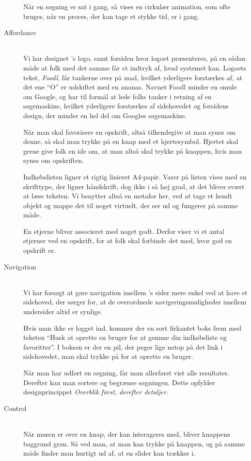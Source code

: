\begin{description}
Når en søgning er sat i gang, så vises en cirkulær animation, som ofte bruges, når en proces, der kan tage et stykke tid, er i gang.   

\item[Affordance] \hfill \\
Vi har designet \Foodl{}'s logo, samt forsiden hvor logoet præsenteres, på en sådan måde at folk med det samme får et indtryk af, hvad systemet kan. Logoets tekst, \textit{Foodl}, får tankerne over på mad, hvilket yderligere forstærkes af, at det ene ``O'' er udskiftet med en ananas. Navnet Foodl minder en smule om Google, og har til formål at lede folks tanker i retning af en søgemaskine, hvilket yderligere forstærkes af sidehovedet og forsidens design, der minder en hel del om Googles søgemaskine.

Når man skal favorisere en opskrift, altså tilkendegive at man synes om denne, så skal man trykke på en knap med et hjertesymbol. Hjertet skal gerne give folk en ide om, at man altså skal trykke på knappen, hvis man synes om opskriften.

Indkøbslisten ligner et rigtig linieret A4-papir. Varer på listen vises med en skrifttype, der ligner håndskrift, dog ikke i så høj grad, at det bliver svært at læse teksten. Vi benytter altså en metafor her, ved at tage et kendt objekt og mappe det til noget virtuelt, der ser ud og fungerer på samme måde.

En stjerne bliver associeret med noget godt. Derfor viser vi et antal stjerner ved en opskrift, for at folk skal forbinde det med, hvor god en opskrift er.

\item[Navigation] \hfill \\
Vi har forsøgt at gøre navigation imellem \Foodl's sider mere enkel ved at have et sidehoved, der sørger for, at de overordnede navigeringsmuligheder imellem undersider altid er synlige.

Hvis man ikke er logget ind, kommer der en sort firkantet boks frem med teksten ``Husk at oprette en bruger for at gemme din indkøbsliste og favoritter''. I boksen er der en pil, der peger lige netop på det link i sidehovedet, man skal trykke på for at oprette en bruger.

Når man har udført en søgning, får man allerførst vist alle resultater. Derefter kan man sortere og begrænse søgningen. Dette opfylder designprincippet \textit{Overblik først, derefter detaljer}.

\item[Control] \hfill \\
Når musen er over en knap, der kan interageres med, bliver knappens baggrund grøn. Så ved man, at man kan trykke på knappen, og på samme måde finder man hurtigt ud af, at en slider kan trækkes i.
  

\end{description}
